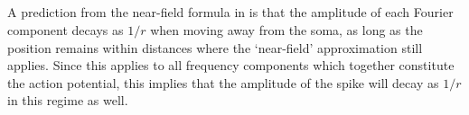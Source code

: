





\subsection{}

A prediction from the near-field formula in  is that the amplitude of each Fourier component decays as $1/r$ when moving away from the soma, as long as the position remains within distances where the `near-field' approximation still applies. Since this applies to all frequency components which together constitute the action potential, this implies that the amplitude of the spike will decay as $1/r$ in this regime as well. 

